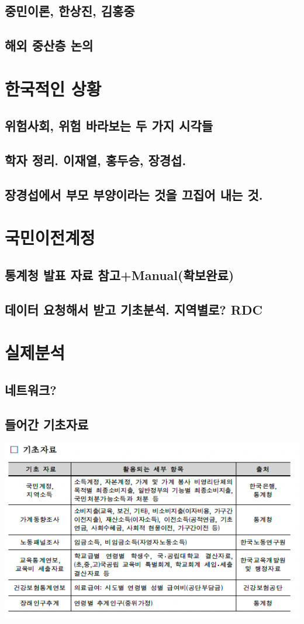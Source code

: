 \documentclass[11pt, a4paper]{article}
\begin{document}
\subsection{중민이론, 한상진, 김홍중}

\subsection{해외 중산층 논의}

\section{한국적인 상황}

\subsection{위험사회, 위험 바라보는 두 가지 시각들}

\subsection{학자 정리. 이재열, 홍두승, 장경섭.}

\subsection{장경섭에서 부모 부양이라는 것을 끄집어 내는 것.}

\section{국민이전계정}
\subsection{통계청 발표 자료 참고+Manual(확보완료)}
\subsection{데이터 요청해서 받고 기초분석. 지역별로? RDC}

\section{실제분석}
\subsection{네트워크?}
\subsection{들어간 기초자료}
\includegraphics[]{basic_material_list.png}



\printbibliography
\end{document}
